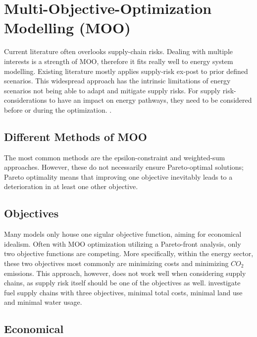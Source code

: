 \section{Multi-Objective-Optimization Modelling (MOO)} 
\label{sec_moo_sota}
Current literature often overlooks supply-chain risks. Dealing with multiple interests is a strength of MOO, therefore it fits really well to energy system modelling. Existing literature mostly applies supply-risk ex-post to prior defined scenarios. This widespread approach has the intrinsic limitations of energy scenarios not being able to adapt and mitigate supply risks. For supply risk-considerations to have an impact on energy pathways, they need to be considered before or during the optimization. \cite{colucciCombinedAssessmentMaterial2025}.

    \subsection{Different Methods of MOO} 
    \label{subsec_moo_methods}
    The most common methods are the epsilon-constraint and weighted-sum approaches. However, these do not necessarily ensure Pareto-optimal solutions; Pareto optimality means that improving one objective inevitably leads to a deterioration in at least one other objective. \cite{colucciCombinedAssessmentMaterial2025}

    \subsection{Objectives} 
    \label{subsec_objectives}
    Many models only house one sigular objective function, aiming for economical idealism. \cite{farajiamiriMultiobjectiveOptimizationRenewable2023}
    Often with MOO optimization utilizing a Pareto-front analysis, only two objective functions are competing. More specifically, within the energy sector, these two objectives most commonly are minimizing costs and minimizing $CO_{2}$ emissions. This approach, however, does not work well when considering supply chains, as supply risk itself should be one of the objectives as well. \cite{colucciCombinedAssessmentMaterial2025}
    \textcite{farajiamiriMultiobjectiveOptimizationRenewable2023} investigate fuel supply chains with three objectives, minimal total costs, minimal land use and minimal water usage.

    \subsection{Economical} 
    \label{subsec_economical_sota}

